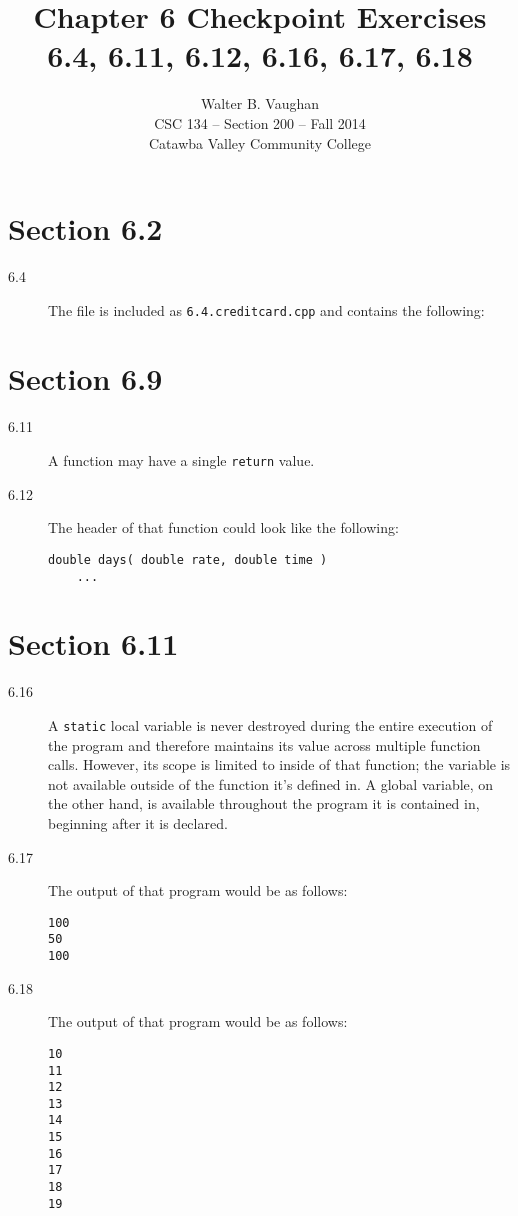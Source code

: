 \documentclass[11pt]{article}
\author{Walter B. Vaughan\\
        \small CSC 134 -- Section 200 -- Fall 2014\\
        \small Catawba Valley Community College}
\title{Chapter 6 Checkpoint Exercises \\ 
       \footnotesize{6.4, 6.11, 6.12, 6.16, 6.17, 6.18}}
\date{\vspace{-5ex}}
\begin{document}
\maketitle


\section*{Section 6.2}

\begin{description}

	\item[6.4] The file is included as \texttt{6.4.creditcard.cpp} and contains the following:
	
	
\end{description}


\section*{Section 6.9}

\begin{description}
	
	\item[6.11] A function may have a single \lstinline{return} value.
	
	\item[6.12] The header of that function could look like the following:
\begin{lstlisting}
double days( double rate, double time )
	...
\end{lstlisting}

\end{description}


\section*{Section 6.11}

\begin{description}

	\item[6.16] A \lstinline{static} local variable is never destroyed during the entire execution of the program and therefore maintains its value across multiple function calls. However, its scope is limited to inside of that function; the variable is not available outside of the function it's defined in. A global variable, on the other hand, is available throughout the program it is contained in, beginning after it is declared.
	
	\item[6.17] The output of that program would be as follows: \begin{verbatim}
100
50
100
\end{verbatim}
	
	\item[6.18] The output of that program would be as follows: \begin{verbatim}
10
11
12
13
14
15
16
17
18
19
\end{verbatim}
	
\end{description}
\end{document}
